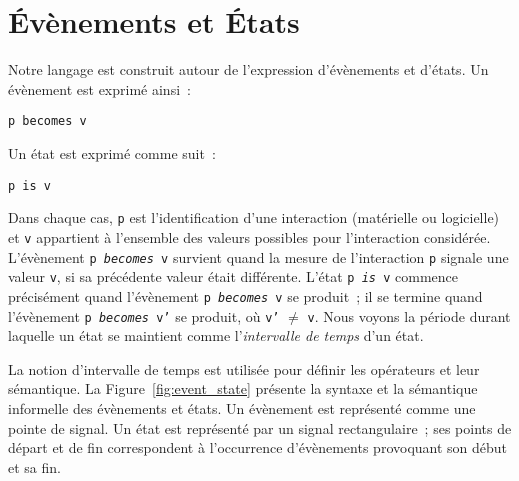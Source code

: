 \section{Évènements et États}\label{sec:dsl:eventstate}
Notre langage est construit autour de l'expression d'évènements et d'états. 
Un évènement est exprimé ainsi~: 
\begin{lstlisting}[language=MaloyaText]
p becomes v
\end{lstlisting}
Un état est exprimé comme suit~: 
\begin{lstlisting}[language=MaloyaText]
p is v
\end{lstlisting}
Dans chaque cas, {\tt p} est l'identification d'une interaction
(matérielle ou logicielle) et {\tt v} appartient à l'ensemble des
valeurs possibles pour l'interaction considérée. L'évènement {\tt p
  {\em becomes} v} survient quand la mesure de l'interaction {\tt p}
signale une valeur {\tt v}, si sa précédente valeur était
différente. L'état {\tt p {\em is} v} commence précisément quand
l'évènement {\tt p {\em becomes} v} se produit~; il se termine quand
l'évènement {\tt p {\em becomes} v'} se produit, où {\tt v'} $\neq$
{\tt v}. Nous voyons la période durant laquelle un état se maintient
comme l'{\em intervalle de temps} d'un état.

La notion d'intervalle de temps est utilisée pour définir les
opérateurs et leur sémantique. La Figure~\ref{fig:event_state}
présente la syntaxe et la sémantique informelle des évènements et
états.  Un évènement est représenté comme une pointe de signal.
Un état est représenté par un signal rectangulaire~; ses points de
départ et de fin correspondent à l'occurrence d'évènements provoquant
son début et sa fin.

